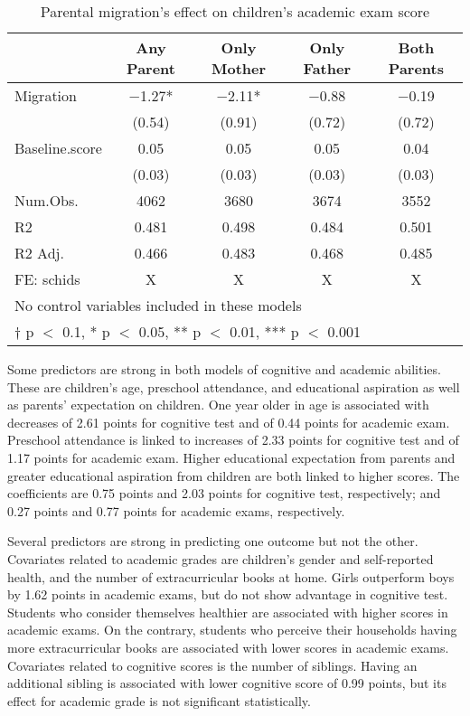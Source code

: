 \documentclass[
  man,floatsintext]{apa7}
\begin{document}
\begin{table}

\caption{Parental migration’s effect on children’s academic exam score}
\centering
\begin{tabular}[t]{lcccc}
\toprule
  & Any Parent & Only Mother & Only Father & Both Parents\\
\midrule
Migration & \num{-1.27}* & \num{-2.11}* & \num{-0.88} & \num{-0.19}\\
 & (\num{0.54}) & (\num{0.91}) & (\num{0.72}) & (\num{0.72})\\
Baseline.score & \num{0.05} & \num{0.05} & \num{0.05} & \num{0.04}\\
 & (\num{0.03}) & (\num{0.03}) & (\num{0.03}) & (\num{0.03})\\
\midrule
Num.Obs. & \num{4062} & \num{3680} & \num{3674} & \num{3552}\\
R2 & \num{0.481} & \num{0.498} & \num{0.484} & \num{0.501}\\
R2 Adj. & \num{0.466} & \num{0.483} & \num{0.468} & \num{0.485}\\
FE: schids & X & X & X & X\\
\bottomrule
\multicolumn{5}{l}{\rule{0pt}{1em}No control variables included in these models}\\
\multicolumn{5}{l}{\rule{0pt}{1em}† p $<$ 0.1, * p $<$ 0.05, ** p $<$ 0.01, *** p $<$ 0.001}\\
\end{tabular}
\end{table}

\newpage

Some predictors are strong in both models of cognitive and academic abilities. These are children's age, preschool attendance, and educational aspiration as well as parents' expectation on children. One year older in age is associated with decreases of 2.61 points for cognitive test and of 0.44 points for academic exam. Preschool attendance is linked to increases of 2.33 points for cognitive test and of 1.17 points for academic exam. Higher educational expectation from parents and greater educational aspiration from children are both linked to higher scores. The coefficients are 0.75 points and 2.03 points for cognitive test, respectively; and 0.27 points and 0.77 points for academic exams, respectively.

Several predictors are strong in predicting one outcome but not the other. Covariates related to academic grades are children's gender and self-reported health, and the number of extracurricular books at home. Girls outperform boys by 1.62 points in academic exams, but do not show advantage in cognitive test. Students who consider themselves healthier are associated with higher scores in academic exams. On the contrary, students who perceive their households having more extracurricular books are associated with lower scores in academic exams. Covariates related to cognitive scores is the number of siblings. Having an additional sibling is associated with lower cognitive score of 0.99 points, but its effect for academic grade is not significant statistically.
\end{document}
